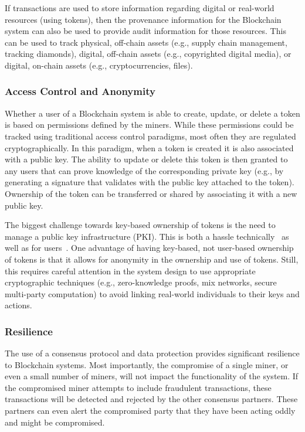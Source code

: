 If transactions are used to store information regarding digital or real-world resources (using tokens), then the provenance information for the Blockchain system can also be used to provide audit information for those resources.
This can be used to track physical, off-chain assets (e.g., supply chain management, tracking diamonds), digital, off-chain assets (e.g., copyrighted digital media), or digital, on-chain assets (e.g., cryptocurrencies, files).
 
\subsubsection{Access Control and Anonymity}
Whether a user of a Blockchain system is able to create, update, or delete a token is based on permissions defined by the miners.
While these permissions could be tracked using traditional access control paradigms, most often they are regulated cryptographically.
In this paradigm, when a token is created it is also associated with a public key.
The ability to update or delete this token is then granted to any users that can prove knowledge of the corresponding private key (e.g., by generating a signature that validates with the public key attached to the token).
Ownership of the token can be transferred or shared by associating it with a new public key.

The biggest challenge towards key-based ownership of tokens is the need to manage a public key infrastructure (PKI).
This is both a hassle technically~\cite{CT} as well as for users~\cite{ruoti2015johnny,barber2012bitter}.
One advantage of having key-based, not user-based ownership of tokens is that it allows for anonymity in the ownership and use of tokens.
Still, this requires careful attention in the system design to use appropriate cryptographic techniques (e.g., zero-knowledge proofs, mix networks, secure multi-party computation) to avoid linking real-world individuals to their keys and actions.
 
\subsubsection{Resilience}
The use of a consensus protocol and data protection provides significant resilience to Blockchain systems.
Most importantly, the compromise of a single miner, or even a small number of miners, will not impact the functionality of the system.
If the compromised miner attempts to include fraudulent transactions, these transactions will be detected and rejected by the other consensus partners.
These partners can even alert the compromised party that they have been acting oddly and might be compromised.

